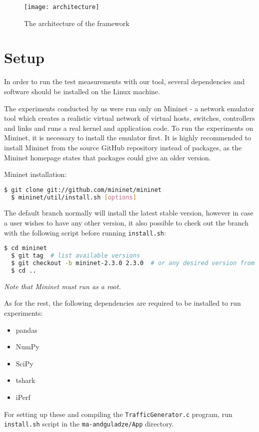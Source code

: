 \begin{figure}[htp]
 \centering
 \texttt{[image: architecture]}
 \caption{The architecture of the framework}
 \label{architecture}

\end{figure}


\section{Setup}
In order to run the test measurements with our tool, several dependencies and software should be installed on the Linux machine.

The experiments conducted by us were run only on Mininet - a network emulator tool which creates a realistic virtual network of virtual hosts, switches, controllers and links and runs a real kernel and application code\cite{mnHome}.
To run the experiments on Mininet, it is necessary to install the emulator first.
It is highly recommended to install Mininet from the source GitHub repository instead of packages, as the Mininet homepage\cite{mnInstall} states that packages could give an older version. 

Mininet installation:
\begin{lstlisting}[language=bash]
  $ git clone git://github.com/mininet/mininet
  $ mininet/util/install.sh [options]
\end{lstlisting}
The default branch normally will install the latest stable version, however in case a user wishes to have any other version, it also possible to check out the branch with the following script before running \texttt{install.sh}:
\begin{lstlisting}[language=bash]
  $ cd mininet
  $ git tag  # list available versions
  $ git checkout -b mininet-2.3.0 2.3.0  # or any desired version from the list
  $ cd ..
\end{lstlisting}
\emph{Note that Mininet must run as a root.}


As for the rest, the following dependencies are required to be installed to run experiments:
\begin{itemize}
	\item pandas
	\item NumPy
	\item SciPy
	\item tshark
	\item iPerf
\end{itemize}
For setting up these and compiling the \texttt{TrafficGenerator.c} program, run \texttt{install.sh} script in the \texttt{ma-andguladze/App} directory.

